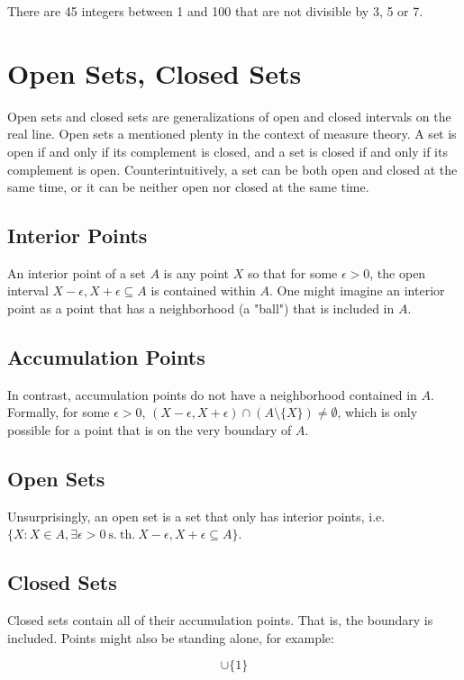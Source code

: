 There are 45 integers between 1 and 100 that are not divisible by 3, 5 or 7.



\section{Open Sets, Closed Sets}
Open sets and closed sets are generalizations of open and closed intervals on the real line. Open sets a mentioned plenty in the context of measure theory. A set is open if and only if its complement is closed, and a set is closed if and only if its complement is open. Counterintuitively, a set can be both open and closed at the same time, or it can be neither open nor closed at the same time.

\subsection{Interior Points}
An interior point of a set $A$ is any point $X$ so that for some $\epsilon > 0$, the open interval $X-\epsilon,X+\epsilon \subseteq A$ is contained within $A$. One might imagine an interior point as a point that has a neighborhood (a "ball") that is included in $A$. 

\subsection{Accumulation Points} 
In contrast, accumulation points do not have a neighborhood contained in $A$. Formally, for some $\epsilon>0$, $(X-\epsilon,X+\epsilon)\cap (A\setminus \{X\}) \neq \emptyset$, which is only possible for a point that is on the very boundary of $A$.

\subsection{Open Sets}
Unsurprisingly, an open set is a set that only has interior points, i.e. $\{X: X\in A, \exists \epsilon > 0 \mathrm{\ s.\ th.\ } X-\epsilon,X+\epsilon \subseteq A  \}$.

\subsection{Closed Sets}
Closed sets contain all of their accumulation points. That is, the boundary is included. Points might also be standing alone, for example:

\begin{equation}
[2,4]\cup\{1\}
\end{equation}

